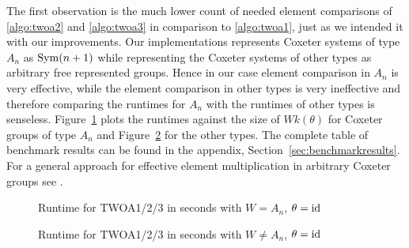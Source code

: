 The first observation is the much lower count of needed element comparisons of \ref{algo:twoa2} and \ref{algo:twoa3} in comparison to \ref{algo:twoa1}, just as we intended it with our improvements. Our implementations represents Coxeter systems of type $A_n$ as $\operatorname{Sym}(n+1)$ while representing the Coxeter systems of other types as arbitrary free represented groups. Hence in our case element comparison in $A_n$ is very effective, while the element comparison in other types is very ineffective and therefore comparing the runtimes for $A_n$ with the runtimes of other types is senseless. Figure~\ref{fig:twoa123-runtime-a} plots the runtimes against the size of $Wk(\theta)$ for Coxeter groups of type $A_n$ and Figure~\ref{fig:twoa123-runtime-not-a} for the other types. The complete table of benchmark results can be found in the appendix, Section~\ref{sec:benchmarkresults}. For a general approach for effective element multiplication in arbitrary Coxeter groups see \cite{casselman:coxeter-multiplication-i,casselman:coxeter-multiplication-ii}.

\begin{figure}[ht]
	\centering
	\caption{Runtime for TWOA1/2/3 in seconds with $W = A_n$, $\theta = \operatorname{id}$}
	\label{fig:twoa123-runtime-a}
\end{figure}

\begin{figure}[ht]
	\centering
	\caption{Runtime for TWOA1/2/3 in seconds with $W \neq A_n$, $\theta = \operatorname{id}$}
	\label{fig:twoa123-runtime-not-a}
\end{figure}

